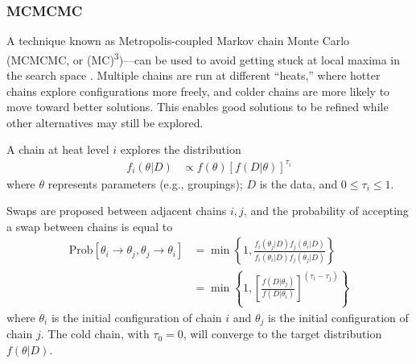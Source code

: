 \documentclass[12pt]{article}
\newcommand{\Prob}{\mathrm{Prob}}
\begin{document}
\subsubsection{MCMCMC}
\label{mc3}

A technique known as Metropolis-coupled Markov chain Monte Carlo (MCMCMC, or (MC)\textsuperscript{3})---can be used to avoid getting stuck at local maxima in the search space \cite{geyer1991}. Multiple chains are run at different ``heats,'' where hotter chains explore configurations more freely, and colder chains are more likely to move toward better solutions. This enables good solutions to be refined while other alternatives may still be explored.

A chain at heat level $i$ explores the distribution
\begin{align}
	f_i(\theta | D) &\propto f(\theta) \left[f\left(D | \theta \right) \right]^{\tau_i}
\end{align}
where $\theta$ represents parameters (e.g., groupings); $D$ is the data, and $0 \leq \tau_i \leq 1$.

Swaps are proposed between adjacent chains $i, j$, and the probability of accepting a swap between chains is equal to
\begin{align}
\Prob[\theta_i \rightarrow \theta_j, \theta_j \rightarrow \theta_i] &= \min \left\{ 
	1,
	\frac{
		f_i(\theta_j | D) f_j(\theta_i | D)
	}
	{
		f_i(\theta_i | D) f_j(\theta_j | D)
	}
\right\} \\
&=
\min \left\{ 
	1,
	\left[ \frac{
		f(D | \theta_j)
	}
	{
		f(D | \theta_i)
	} \right]^{(\tau_i - \tau_j)}
\right\}
\end{align}
where $\theta_i$ is the initial configuration of chain $i$ and $\theta_j$ is the initial configuration of chain $j$. The cold chain, with $\tau_0 = 0$, will converge to the target distribution $f(\theta | D)$.



\end{document}
